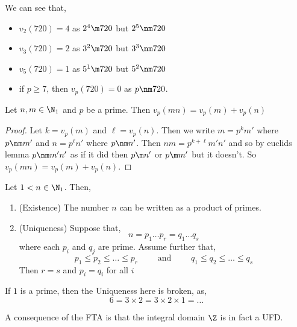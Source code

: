 \begin{eg}
  We can see that,
  \begin{itemize}
    \item $v_2(720) = 4$ as $2^4 \m 720$ but $2^5 \nm 720$
    \item $v_3 (720) = 2$ as $3^2 \m 720$ but $3^3 \nm 720$
    \item $v_5 (720) = 1$ as $5^1 \m 720$ but $5^2 \nm 720$
    \item if $p \ge 7$, then $v_p (720) = 0$ as $p \nm 720$.
  \end{itemize}
\end{eg}

\begin{nlemma}
  Let $n,m \in \N_1$ and $p$ be a prime. Then $v_p(mn) = v_p(m) + v_p(n)$
\end{nlemma}
\begin{proof}
  Let $k = v_p(m)$ and $\ell = v_p(n)$. Then we write $m = p^km'$ where $p\nm m'$ and $n = p^\ell n'$ where $p \nm n'$. Then $nm = p^{k + \ell}m'n'$ and so by euclids lemma $p \nm m'n'$ as if it did then $p \m n'$ or $p \m m'$ but it doesn't. So $v_p (mn) = v_p(m) + v_p(n)$.
\end{proof}

\begin{nthm}
  Let $1 < n \in \N_1$. Then,
  \begin{enumerate}
    \item (Existence) The number $n$ can be written as a product of primes.
    \item (Uniqueness) Suppose that,
    $$ n = p_1 \dots p_r = q_1 \dots q_s $$
    where each $p_i$ and $q_j$ are prime. Assume further that,
    $$ p_1 \le p_2 \le \dots \le p_r \qquad \text{ and } \qquad q_1 \le q_2 \le \dots \le q_s $$
    Then $r = s$ and $p_i = q_i$ for all $i$
  \end{enumerate}
\end{nthm}

\begin{remark}
  If $1$ is a prime, then the Uniqueness here is broken, as,
  $$ 6 = 3 \times 2 = 3 \times 2 \times 1 = \dots $$
\end{remark}

\begin{remark}
   A consequence of the FTA is that the integral domain $\Z$ is in fact a UFD.
\end{remark}

